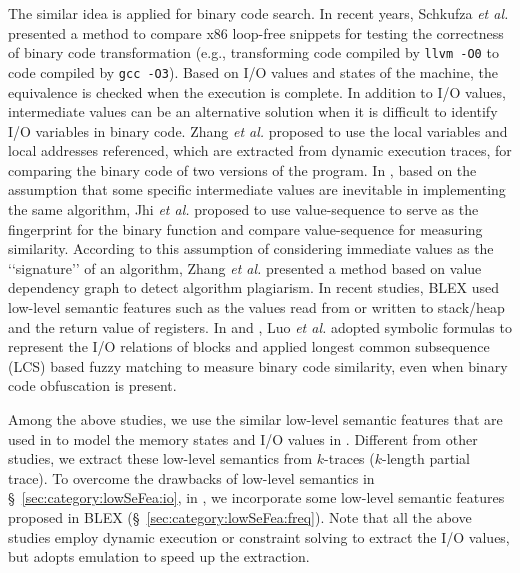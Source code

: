 The similar idea is applied for binary code search. In recent years, Schkufza \emph{et al.} \cite{DBLP:conf/asplos/Schkufza0A13} presented a method to compare x86 loop-free snippets for testing the correctness of binary code transformation (e.g., transforming code compiled by \texttt{llvm -O0}  to code compiled by \texttt{gcc -O3}). Based on I/O values and states of the machine, the equivalence is checked when the execution is complete. %
In addition to I/O values,  intermediate values can be an alternative solution when it is difficult to identify I/O variables in binary code. Zhang \emph{et al.} \cite{DBLP:conf/sigsoft/ZhangG05} proposed to use the local variables and local addresses referenced, which are extracted from dynamic execution traces,  for comparing the binary code of two versions of the program. In \cite{DBLP:conf/icse/JhiWJZLW11}, based on the assumption that some specific intermediate values are inevitable in implementing the same algorithm, Jhi \emph{et al.} \cite{DBLP:conf/icse/JhiWJZLW11} proposed to use value-sequence to serve as the fingerprint for the binary function and compare value-sequence for measuring similarity. According to this assumption of considering immediate values as the \lq\lq signature\rq\rq{} of an algorithm, Zhang \emph{et al.} \cite{DBLP:conf/issta/ZhangJWLZ12} presented a method based on value dependency graph to detect algorithm plagiarism. In recent studies,  \textsc{BLEX} \cite{egele2014blanket} used low-level semantic features such as the values read from or written to stack/heap  and the return value of registers.
In \cite{luo2014semantics} and \cite{cop-tse}, Luo \emph{et al.} adopted symbolic formulas to represent the I/O relations of blocks and applied longest common subsequence (LCS)
based fuzzy matching to measure binary code similarity, even when binary code obfuscation is present.

Among the above studies, we use the similar low-level semantic features that are used in  \cite{DBLP:conf/icse/KimJKY11,luo2014semantics,cop-tse} to model the memory states and I/O values in \tool. Different from other studies, we extract these low-level semantics from $k$-traces ($k$-length partial trace). To overcome the drawbacks of low-level semantics in \S~\ref{sec:category:lowSeFea:io}, in \toolNew, we incorporate some low-level semantic features proposed in \textsc{BLEX} \cite{egele2014blanket} (\S~\ref{sec:category:lowSeFea:freq}). Note that all the above studies employ dynamic execution or constraint solving to extract the I/O values, but \toolNew adopts emulation to speed up the extraction.


